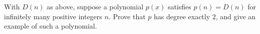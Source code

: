 With $D(n)$ as above, suppose a polynomial $p(x)$ satisfies $p(n)=D(n)$ for infinitely many positive integers $n$. Prove that $p$ has degree exactly $2$, and give an example of such a polynomial.
